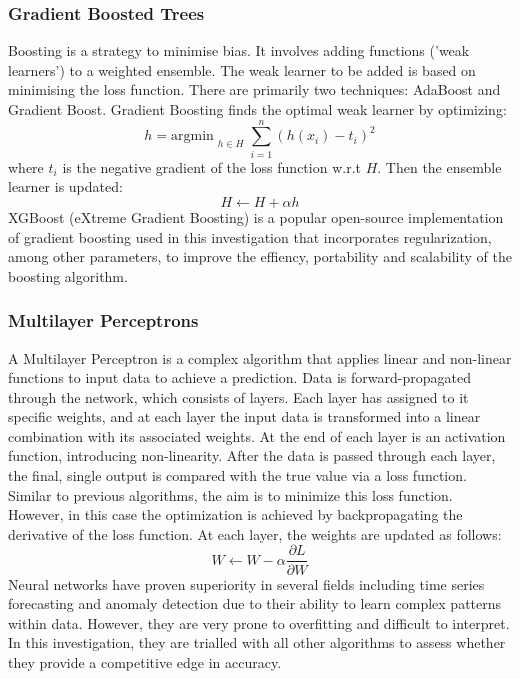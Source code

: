 \documentclass[a4paper]{report}
\begin{document}
\subsubsection{Gradient Boosted Trees}
Boosting is a strategy to minimise bias. It involves adding functions ('weak learners') to a weighted ensemble. The weak learner to be added is based on minimising the loss function. There are primarily two techniques: AdaBoost and Gradient Boost.
Gradient Boosting finds the optimal weak learner by optimizing: 
\begin{equation}
  h = \text{argmin}_{\substack{h \in H}} \sum_{i=1}^{n} (h(x_i) - t_i)^2
\end{equation}
where \(t_i\) is the negative gradient of the loss function w.r.t \(H\). Then the ensemble learner is updated:
\begin{equation}
  H \leftarrow H + \alpha h
\end{equation}
XGBoost (eXtreme Gradient Boosting) is a popular open-source implementation of gradient boosting used in this investigation that incorporates regularization, among other parameters, to improve the effiency, portability and scalability of the boosting algorithm.

\subsubsection{Multilayer Perceptrons}
A Multilayer Perceptron is a complex algorithm that applies linear and non-linear functions to input data to achieve a prediction. Data is forward-propagated 
through the network, which consists of layers. Each layer has assigned to it specific weights, and at each layer the input data is transformed into a linear combination with 
its associated weights. At the end of each layer is an activation function, introducing non-linearity. After the data is passed through each layer, the final, single output 
is compared with the true value via a loss function. Similar to previous algorithms, the aim is to minimize this loss function. However, in this case the optimization is achieved 
by backpropagating the derivative of the loss function. At each layer, the weights are updated as follows: 
\begin{equation}
  W \leftarrow W - \alpha \frac{\partial L}{\partial W}
\end{equation}
Neural networks have proven superiority in several fields including time series forecasting and anomaly detection due to their ability to learn complex patterns within data. However, 
they are very prone to overfitting and difficult to interpret. In this investigation, they are trialled with all other algorithms to assess whether they provide a competitive edge in accuracy.
\end{document}

